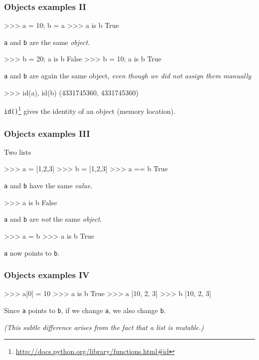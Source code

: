 \documentclass[xetex,10pt]{beamer}
\def\spacer{\vspace*{1em}}
\def\pythoni{\lstinline[language=pythontim]}
\begin{document}
\begin{frame}[fragile]
	\frametitle{Objects examples II}

\begin{python}
>>> a = 10; b = a
>>> a is b
True
\end{python}

\pythoni{a} and \pythoni{b} are the same \emph{object}.
\pause

\begin{python}
>>> b = 20; a is b
False
>>> b = 10; a is b
True
\end{python}

\pythoni{a} and \pythoni{b} are again the same object, \emph{even though we did not assign them manually}
\pause

\begin{python}
>>> id(a), id(b)
(4331745360, 4331745360)
\end{python}

\pythoni{id()}\footnote[frame]{\url{http://docs.python.org/library/functions.html\#id}} gives the identity of an object (memory location).

\end{frame}

\begin{frame}[fragile]
	\frametitle{Objects examples III}

Two lists
\begin{python}
>>> a = [1,2,3]
>>> b = [1,2,3]
>>> a == b
True
\end{python}

\pythoni{a} and \pythoni{b} have the same \emph{value}.	
\pause

\begin{python}
>>> a is b
False
\end{python}

\pythoni{a} and \pythoni{b} are \emph{not} the same \emph{object}.	
\pause

\begin{python}
>>> a = b
>>> a is b
True
\end{python}

\pythoni{a} now points to \pythoni{b}.
\pause

\end{frame}


\begin{frame}[fragile]
	\frametitle{Objects examples IV}

\begin{python}
>>> a[0] = 10
>>> a is b
True
>>> a
[10, 2, 3]
>>> b
[10, 2, 3]
\end{python}

Since \pythoni{a} points to \pythoni{b}, if we change \pythoni{a}, we also change \pythoni{b}.

	\spacer

\emph{(This subtle difference arises from the fact that a list is mutable.)}

\end{frame}
\end{document}

